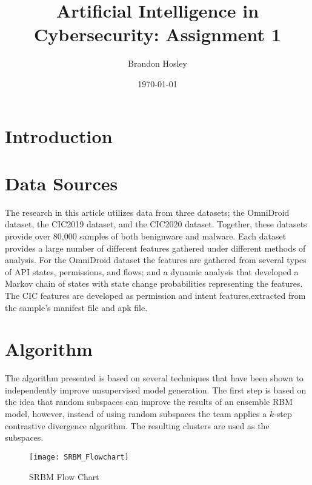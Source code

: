 \documentclass[]{article}
\title{Artificial Intelligence in Cybersecurity: Assignment 1}
\author{Brandon Hosley}
\date{\today}
\begin{document}
	\maketitle
	
\section{Introduction}

\section{Data Sources}

The research in this article utilizes data from three datasets; 
the OmniDroid \cite{Martin2019} dataset,  
the CIC2019 \cite{Taheri2019} dataset, and
the CIC2020 \cite{Rahali2020} dataset.
Together, these datasets provide over 80,000 samples of both benignware and malware.
Each dataset provides a large number of different features gathered under different methods of analysis.
For the OmniDroid dataset the features are gathered from several types of API states, permissions, and flows;
and a dynamic analysis that developed a Markov chain of states with state change probabilities representing the features.
The CIC features are developed as permission and intent features,extracted from the sample's manifest file and apk file.

\section{Algorithm}

The algorithm presented is based on several techniques that have been shown to independently improve unsupervised model generation.
The first step is based on the idea that random subspaces can improve the results of an ensemble RBM model, however, instead of using random subspaces the team applies a $k$-step contrastive divergence algorithm.
The resulting clusters are used as the subspaces.


\begin{figure}[h]
	\centering
	\texttt{[image: SRBM\_Flowchart]}
	\caption{SRBM Flow Chart \cite{Liu2021}}
\end{figure}
\end{document}

